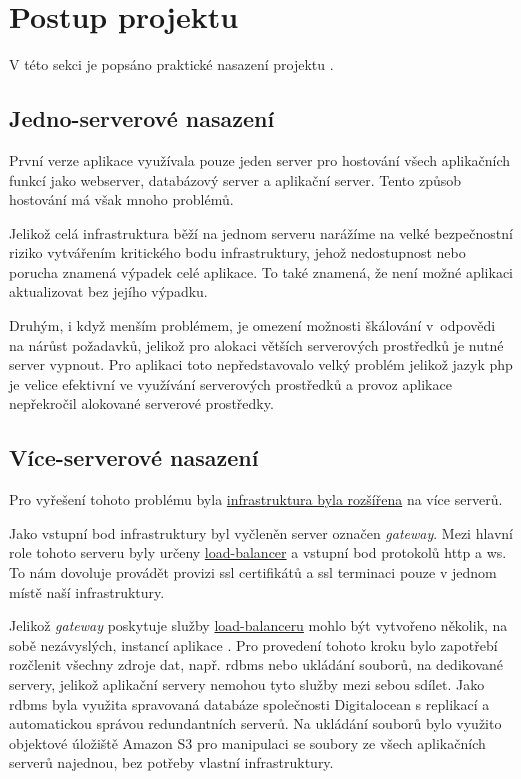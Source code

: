 
\section{Postup projektu}

V této sekci je popsáno praktické nasazení projektu \bso{}.

\subsection{Jedno-serverové nasazení}

První verze aplikace \bso{} využívala pouze jeden server pro hostování všech aplikačních funkcí jako \acrshort{webserver}, databázový server a aplikační server. Tento způsob hostování má však mnoho problémů.

Jelikož celá infrastruktura běží na jednom serveru narážíme na velké bezpečnostní riziko vytvářením kritického bodu infrastruktury, jehož nedostupnost nebo porucha znamená výpadek celé aplikace. 
To také znamená, že není možné aplikaci aktualizovat bez jejího výpadku. 

Druhým, i když menším problémem, je omezení možnosti škálování v~odpovědi na nárůst požadavků, jelikož pro alokaci větších serverových prostředků je nutné server vypnout.
Pro aplikaci \bso{} toto nepředstavovalo velký problém jelikož jazyk \acrshort{php} je velice efektivní ve využívání serverových prostředků a provoz aplikace nepřekročil alokované serverové prostředky.

\subsection{Více-serverové nasazení}

Pro vyřešení tohoto problému byla \hyperref[fig:servery]{infrastruktura byla rozšířena} na více serverů. 

Jako vstupní bod infrastruktury byl vyčleněn server označen \textit{gateway}.
Mezi hlavní role tohoto serveru byly určeny \hyperref[sub:load-balancing]{load-balancer} a vstupní bod protokolů \acrshort{http} a \acrshort{ws}.
To nám dovoluje provádět provizi ssl certifikátů a ssl terminaci pouze v jednom místě naší infrastruktury.

Jelikož \textit{gateway} poskytuje služby \hyperref[sub:load-balancing]{load-balanceru} mohlo být vytvořeno několik, na sobě nezávyslých, instancí aplikace \bso{}.
Pro provedení tohoto kroku bylo zapotřebí rozčlenit všechny zdroje dat, např. \acrshort{rdbms} nebo ukládání souborů, na dedikované servery, jelikož aplikační servery nemohou tyto služby mezi sebou sdílet.
Jako \acrshort{rdbms} byla využita spravovaná databáze společnosti Digitalocean s replikací a automatickou správou redundantních serverů.
Na ukládání souborů bylo využito objektové úložiště Amazon S3 pro manipulaci se soubory ze všech aplikačních serverů najednou, bez potřeby vlastní infrastruktury.

